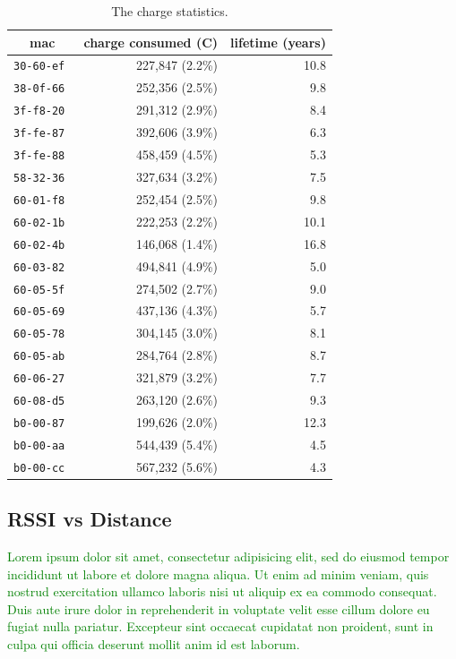 \documentclass{sig-alternate}
\newcommand{\lorem}               {\textcolor{green}{Lorem ipsum dolor sit amet, consectetur adipisicing elit, sed do eiusmod tempor incididunt ut labore et dolore magna aliqua. Ut enim ad minim veniam, quis nostrud exercitation ullamco laboris nisi ut aliquip ex ea commodo consequat. Duis aute irure dolor in reprehenderit in voluptate velit esse cillum dolore eu fugiat nulla pariatur. Excepteur sint occaecat cupidatat non proident, sunt in culpa qui officia deserunt mollit anim id est laborum.}}
\begin{document}
\begin{table}
  \begin{tabular}{|c|r|r|}
     \hline
     mac            & charge consumed (C) & lifetime (years)\\
     \hline
     \tt{30-60-ef}  & 227,847 (2.2\%)      & 10.8 \\
     \tt{38-0f-66}  & 252,356 (2.5\%)      &  9.8 \\
     \tt{3f-f8-20}  & 291,312 (2.9\%)      &  8.4 \\
     \tt{3f-fe-87}  & 392,606 (3.9\%)      &  6.3 \\
     \tt{3f-fe-88}  & 458,459 (4.5\%)      &  5.3 \\
     \tt{58-32-36}  & 327,634 (3.2\%)      &  7.5 \\
     \tt{60-01-f8}  & 252,454 (2.5\%)      &  9.8 \\
     \tt{60-02-1b}  & 222,253 (2.2\%)      & 10.1 \\
     \tt{60-02-4b}  & 146,068 (1.4\%)      & 16.8 \\
     \tt{60-03-82}  & 494,841 (4.9\%)      &  5.0 \\
     \tt{60-05-5f}  & 274,502 (2.7\%)      &  9.0 \\
     \tt{60-05-69}  & 437,136 (4.3\%)      &  5.7 \\
     \tt{60-05-78}  & 304,145 (3.0\%)      &  8.1 \\
     \tt{60-05-ab}  & 284,764 (2.8\%)      &  8.7 \\
     \tt{60-06-27}  & 321,879 (3.2\%)      &  7.7 \\
     \tt{60-08-d5}  & 263,120 (2.6\%)      &  9.3 \\
     \tt{b0-00-87}  & 199,626 (2.0\%)      & 12.3 \\
     \tt{b0-00-aa}  & 544,439 (5.4\%)      &  4.5 \\
     \tt{b0-00-cc}  & 567,232 (5.6\%)      &  4.3 \\
     \hline
  \end{tabular}
  \caption{The charge statistics.}
  \label{tab:stats_charge}
\end{table}

\subsection{RSSI vs Distance}
\label{sec:rssi_distance}

\lorem
\end{document}
